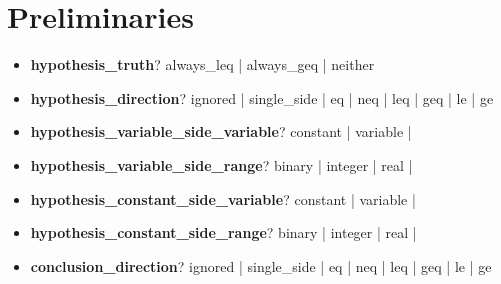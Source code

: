 \documentclass[onecolumn]{ctexart}
\begin{document}


\vspace{30pt}
\section{Preliminaries}

\begin{itemize}

    \item  \textbf{hypothesis_truth}? \qquad
        {\color{green} always\_leq}  \quad  |  \quad
        {\color{red  } always\_geq}  \quad  |  \quad
        {\color{red  } neither}  %

    \item  \textbf{hypothesis_direction}? \qquad
        {\color{gray} ignored}      \quad  |  \quad
        {\color{gray} single_side}  \quad  |  \quad
        {\color{green} eq}   \quad  |  \quad
        {\color{red  } neq}  \quad  |  \quad
        {\color{red  } leq}  \quad  |  \quad
        {\color{red  } geq}  \quad  |  \quad
        {\color{red  } le}   \quad  |  \quad
        {\color{red  } ge}   %

    \item  \textbf{hypothesis_variable_side_variable}?
        {\color{green} constant}  \quad  |  \quad
        {\color{green} variable}  \quad  |  \quad

    \item  \textbf{hypothesis_variable_side_range}? \qquad
        {\color{green} binary}   \quad  |  \quad
        {\color{green} integer}  \quad  |  \quad
        {\color{green} real}     \quad  |  \quad

    \item  \textbf{hypothesis_constant_side_variable}?
        {\color{green} constant}  \quad  |  \quad
        {\color{gray} variable}  \quad  |  \quad
        
    \item  \textbf{hypothesis_constant_side_range}? \qquad
        {\color{green} binary}   \quad  |  \quad
        {\color{green} integer}  \quad  |  \quad
        {\color{green} real}     \quad  |  \quad



    \item  \textbf{conclusion_direction}? \qquad
        {\color{red} ignored}      \quad  |  \quad
        {\color{red} single_side}  \quad  |  \quad
        {\color{green} eq}   \quad  |  \quad
        {\color{red  } neq}  \quad  |  \quad
        {\color{red  } leq}  \quad  |  \quad
        {\color{red  } geq}  \quad  |  \quad
        {\color{red  } le}   \quad  |  \quad
        {\color{red  } ge}   %


\end{itemize}
\end{document}
